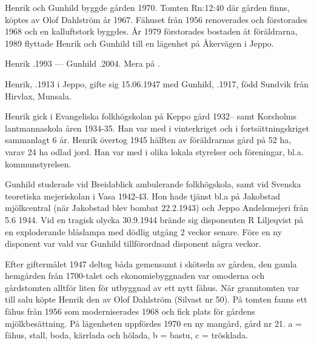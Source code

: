 Henrik och Gunhild byggde gården 1970. Tomten Rn:12:40 där gården finns, köptes av Olof Dahlström år 1967. Fähuset från 1956 renoverades och förstorades 1968 och en kalluftstork byggdes. År 1979 förstorades bostaden åt föräldrarna, 1989 flyttade Henrik och Gunhild till en lägenhet på Åkervägen i Jeppo.

Henrik .1993  ---  Gunhild .2004. Mera på .






Henrik, .1913 i Jeppo, gifte sig 15.06.1947 med Gunhild, .1917, född Sundvik från Hirvlax, Munsala.
\begin{jhchildren}
  \item {}
  \item {}
\end{jhchildren}
Henrik gick i Evangeliska folkhögskolan på Keppo gård 1932-- samt Korsholms lantmannaskola åren 1934-35. Han var med i vinterkriget och i fortsättningskriget sammanlagt 6 år. Henrik övertog 1945 hälften av föräldrarnas gård på 52 ha, varav 24 ha odlad jord. Han var med i olika lokala styrelser och föreningar, bl.a. kommunstyrelsen.

Gunhild studerade vid Breidablick ambulerande folkhögskola, samt vid Svenska teoretiska mejeriskolan i Vasa 1942-43. Hon hade tjänst bl.a på Jakobstad mjölkcentral (när Jakobstad blev bombat 22.2.1943) och Jeppo Andelsmejeri från 5.6 1944. Vid en tragisk olycka 30.9.1944 brände sig disponenten R Liljeqvist på en exploderande blåslampa med dödlig utgång 2 veckor senare. Före en ny disponent var vald var Gunhild tillförordnad disponent några veckor.

Efter giftermålet 1947 deltog båda gemensamt i skötseln av gården, den gamla hemgården från 1700-talet och ekonomiebyggnaden var omoderna och gårdstomten alltför liten för utbyggnad av ett nytt fähus. När granntomten var till salu köpte Henrik den av Olof Dahlström (Silvast nr 50). På tomten fanns ett fähus från 1956 som moderniserades 1968 och fick plats för gårdens mjölkbesättning. På lägenheten uppfördes 1970 en ny mangård, gård nr 21. a = fähus, stall, boda, kärrlada och hölada, b = bastu, c = trösklada.


